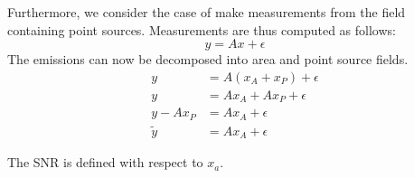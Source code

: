 Furthermore, we consider the case of make measurements from the field containing point sources.
Measurements are thus computed as follows:
\begin{equation}
    y = A x + \epsilon
\end{equation}
The emissions can now be decomposed into area and point source fields.
\begin{align}
    y &= A (x_A + x_P) + \epsilon \\
    y &= A x_A + A x_P + \epsilon \\
    y - A x_P &= A x_A + \epsilon \\
    \tilde{y} &= A x_A + \epsilon
\end{align}

The SNR is defined with respect to $x_a$.



